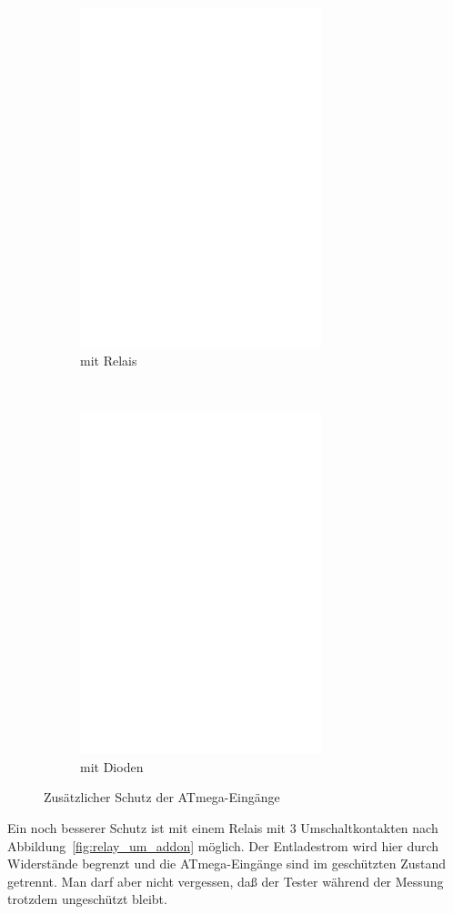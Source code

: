 \begin{figure}[H]
  \begin{subfigure}[b]{9cm}
    \centering
    \includegraphics[width=7cm]{../FIG/relay_addon.eps}
    \caption{mit Relais}
  \end{subfigure}
  ~
  \begin{subfigure}[b]{9cm}
    \centering
    \includegraphics[width=7cm]{../FIG/diode_addon.eps}
    \caption{mit Dioden}
  \end{subfigure}
  \caption{Zusätzlicher Schutz der ATmega-Eingänge}
  \label{fig:relay_addon}
\end{figure}

Ein noch besserer Schutz ist mit einem Relais mit 3 Umschaltkontakten nach Abbildung~\ref{fig:relay_um_addon} möglich.
Der Entladestrom wird hier durch Widerstände begrenzt und die ATmega-Eingänge sind im geschützten Zustand getrennt.
Man darf aber nicht vergessen, daß der Tester während der Messung trotzdem ungeschützt bleibt.

